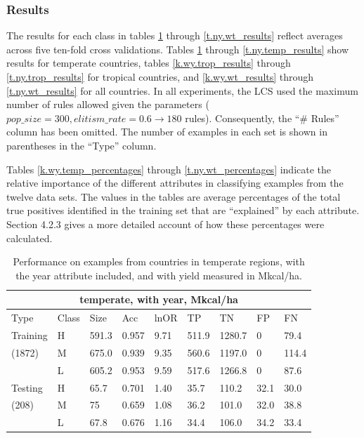 \documentclass[12pt]{article}
\begin{document}
\subsubsection{Results}
The results for each class in tables \ref{k.wy.temp_results} through \ref{t.ny.wt_results} reflect averages across five ten-fold cross validations. Tables \ref{k.wy.temp_results} through \ref{t.ny.temp_results} show results for temperate countries, tables \ref{k.wy.trop_results} through \ref{t.ny.trop_results} for tropical countries, and \ref{k.wy.wt_results} through \ref{t.ny.wt_results} for all countries. In all experiments, the LCS used the maximum number of rules allowed given the parameters ($pop\_size = 300, elitism\_rate = 0.6 \longrightarrow 180$ rules). Consequently, the ``\# Rules'' column has been omitted. The number of examples in each set is shown in parentheses in the ``Type'' column.

Tables \ref{k.wy.temp_percentages} through \ref{t.ny.wt_percentages} indicate the relative importance of the different attributes in classifying examples from the twelve data sets. The values in the tables are average percentages of the total true positives identified in the training set that are ``explained'' by each attribute. Section 4.2.3 gives a more detailed account of how these percentages were calculated.

\begin{table}[h!]
\centering
\begin{tabular}{lllllllll}
\toprule
\multicolumn{9}{c}{\textbf{temperate, with year, Mkcal/ha}} \\
\midrule
Type & Class & Size & Acc & lnOR & TP & TN & FP & FN \\
\midrule
Training & H & 591.3 & 0.957 & 9.71 & 511.9 & 1280.7 & 0 & 79.4  \\
(1872) & M & 675.0 & 0.939 & 9.35 & 560.6 & 1197.0 & 0 & 114.4  \\
& L & 605.2 & 0.953 & 9.59 & 517.6 & 1266.8 & 0 & 87.6  \\
Testing & H & 65.7 & 0.701 & 1.40 & 35.7 & 110.2 & 32.1 & 30.0  \\
(208) & M & 75 & 0.659 & 1.08 & 36.2 & 101.0 & 32.0 & 38.8  \\
& L & 67.8 & 0.676 & 1.16 & 34.4 & 106.0 & 34.2 & 33.4  \\
\bottomrule
\end{tabular}
\caption{Performance on examples from countries in temperate regions, with the year attribute included, and with yield measured in Mkcal/ha.}
\label{k.wy.temp_results}
\end{table}
\end{document}
